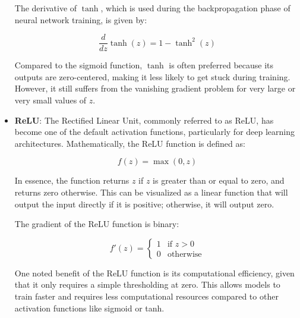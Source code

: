 \begin{itemize}
The derivative of \( \tanh \), which is used during the backpropagation phase of neural network training, is given by:

\[
\frac{d}{dz}\tanh(z) = 1 - \tanh^2(z)
\]

Compared to the sigmoid function, \( \tanh \) is often preferred because its outputs are zero-centered, making it less likely to get stuck during training. However, it still suffers from the vanishing gradient problem for very large or very small values of \( z \).
	
	\item \textbf{ReLU}: 
The Rectified Linear Unit, commonly referred to as ReLU, has become one of the default activation functions, particularly for deep learning architectures. Mathematically, the ReLU function is defined as:

\[
f(z) = \max(0, z)
\]

In essence, the function returns \( z \) if \( z \) is greater than or equal to zero, and returns zero otherwise. This can be visualized as a linear function that will output the input directly if it is positive; otherwise, it will output zero.

The gradient of the ReLU function is binary:

\[
f'(z) = 
\begin{cases} 
1 & \text{if } z > 0 \\
0 & \text{otherwise}
\end{cases}
\]

One noted benefit of the ReLU function is its computational efficiency, given that it only requires a simple thresholding at zero. This allows models to train faster and requires less computational resources compared to other activation functions like sigmoid or tanh.


\end{itemize}
